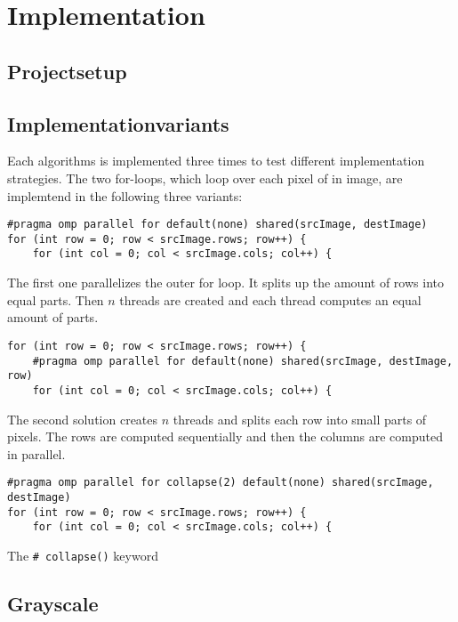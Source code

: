 \chapter{Implementation}

\section{Projectsetup}

\section{Implementationvariants}

Each algorithms is implemented three times to test different implementation strategies. The two for-loops, which loop over each pixel of in image, are implemtend in the following three variants:

\begin{verbatim}
#pragma omp parallel for default(none) shared(srcImage, destImage)
for (int row = 0; row < srcImage.rows; row++) {
    for (int col = 0; col < srcImage.cols; col++) {
\end{verbatim}

\noindent
The first one parallelizes the outer for loop. It splits up the amount of rows into equal parts. Then $ n $ threads are created and each thread computes an equal amount of parts.

\begin{verbatim}
for (int row = 0; row < srcImage.rows; row++) {
    #pragma omp parallel for default(none) shared(srcImage, destImage, row)
    for (int col = 0; col < srcImage.cols; col++) {
\end{verbatim}

\noindent
The second solution creates $ n $ threads and splits each row into small parts of pixels. The rows are computed sequentially and then the columns are computed in parallel.

\begin{verbatim}
#pragma omp parallel for collapse(2) default(none) shared(srcImage, destImage)
for (int row = 0; row < srcImage.rows; row++) {
    for (int col = 0; col < srcImage.cols; col++) {
\end{verbatim}

The \texttt{# collapse()} keyword

\section{Grayscale}


